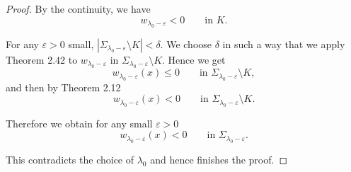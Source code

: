 \begin{proof}
By the continuity, we have
\[
w_{\lambda_0-\varepsilon}<0\qquad \text{in }K.
\]

For any \(\varepsilon>0\) small, \(|\Sigma_{\lambda_0-\varepsilon}\setminus K|<\delta\). We choose \(\delta\) in such a way that we apply
Theorem 2.42 to \(w_{\lambda_0-\varepsilon}\) in \(\Sigma_{\lambda_0-\varepsilon}\setminus K\). Hence we get
\[
w_{\lambda_0-\varepsilon}(x)\leq 0\qquad \text{in }\Sigma_{\lambda_0-\varepsilon}\setminus K,
\]
and then by Theorem 2.12
\[
w_{\lambda_0-\varepsilon}(x)<0\qquad \text{in }\Sigma_{\lambda_0-\varepsilon}\setminus K.
\]

Therefore we obtain for any small \(\varepsilon>0\)
\[
w_{\lambda_0-\varepsilon}(x)<0\qquad \text{in }\Sigma_{\lambda_0-\varepsilon}.
\]

This contradicts the choice of \(\lambda_0\) and hence finishes the proof.
\end{proof}

